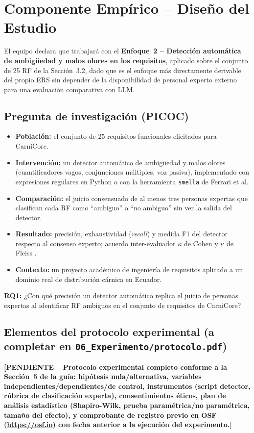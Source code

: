\documentclass[11pt,a4paper]{article}
\newcommand{\PENDIENTE}[1]{\textcolor{pendiente}{\textbf{[PENDIENTE -- #1]}}}
\begin{document}
\section{Componente Empírico -- Diseño del Estudio}
El equipo declara que trabajará con el \textbf{Enfoque~2 -- Detección automática de ambigüedad y malos olores en los requisitos}, aplicado sobre el conjunto de 25 RF de la Sección~3.2, dado que es el enfoque más directamente derivable del propio ERS sin depender de la disponibilidad de personal experto externo para una evaluación comparativa con LLM.

\subsection{Pregunta de investigación (PICOC)}
\begin{itemize}[nosep]
\item \textbf{Población:} el conjunto de 25 requisitos funcionales elicitados para CarniCore.
\item \textbf{Intervención:} un detector automático de ambigüedad y malos olores (cuantificadores vagos, conjunciones múltiples, voz pasiva), implementado con expresiones regulares en Python o con la herramienta \texttt{smella} de Ferrari et al.
\item \textbf{Comparación:} el juicio consensuado de al menos tres personas expertas que clasifican cada RF como ``ambiguo'' o ``no ambiguo'' sin ver la salida del detector.
\item \textbf{Resultado:} precisión, exhaustividad (\textit{recall}) y medida F1 del detector respecto al consenso experto; acuerdo inter-evaluador $\kappa$ de Cohen \cite{cohen1960kappa} y $\kappa$ de Fleiss \cite{fleiss1971kappa}.
\item \textbf{Contexto:} un proyecto académico de ingeniería de requisitos aplicado a un dominio real de distribución cárnica en Ecuador.
\end{itemize}

\textbf{RQ1:} ¿Con qué precisión un detector automático replica el juicio de personas expertas al identificar RF ambiguos en el conjunto de requisitos de CarniCore?

\subsection{Elementos del protocolo experimental (a completar en \texttt{06\_Experimento/protocolo.pdf})}
\PENDIENTE{Protocolo experimental completo conforme a la Sección~5 de la guía: hipótesis nula/alternativa, variables independientes/dependientes/de control, instrumentos (script detector, rúbrica de clasificación experta), consentimientos éticos, plan de análisis estadístico (Shapiro-Wilk, prueba paramétrica/no paramétrica, tamaño del efecto), y comprobante de registro previo en OSF (\url{https://osf.io}) con fecha anterior a la ejecución del experimento.}
\end{document}
